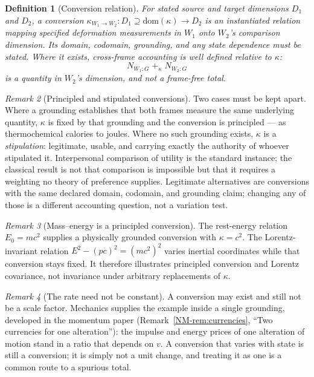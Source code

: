 \documentclass[11pt,a4paper]{article}
\newtheorem{definition}{Definition}[section]
\theoremstyle{remark}
\newtheorem{remark}[definition]{Remark}
\begin{document}
\begin{definition}[Conversion relation]\label{def:conversion}
For stated source and target dimensions $D_1$ and $D_2$, a conversion
$\kappa_{W_1\to W_2}:D_1\supseteq\mathrm{dom}(\kappa)\to D_2$ is an instantiated relation mapping
specified deformation measurements in $W_1$ onto $W_2$'s comparison dimension. Its domain, codomain,
grounding, and any state dependence must be stated. Where it exists, cross-frame accounting is well
defined \emph{relative to $\kappa$}:
\[
N_{W_1:G}\;+_{\kappa}\;N_{W_2:G}
\]
is a quantity in $W_2$'s dimension, and not a frame-free total.
\end{definition}

\begin{remark}[Principled and stipulated conversions]\label{rem:kappa-kinds}
Two cases must be kept apart. Where a grounding establishes that both frames measure the same underlying quantity, $\kappa$ is fixed by that grounding and the conversion is principled --- as thermochemical calories to joules. Where no such grounding exists, $\kappa$ is a \emph{stipulation}: legitimate, usable, and carrying exactly the authority of whoever stipulated it. Interpersonal comparison of utility is the standard instance; the classical result is not that comparison is impossible but that it requires a weighting no theory of preference supplies. Legitimate alternatives are conversions with the same declared domain, codomain, and grounding claim; changing any of those is a different accounting question, not a variation test.
\end{remark}

\begin{remark}[Mass--energy is a principled conversion]\label{rem:emc2}
The rest-energy relation $E_0=mc^2$ supplies a physically grounded
conversion with $\kappa=c^2$. The Lorentz-invariant relation
$E^2-(pc)^2=(mc^2)^2$ varies inertial coordinates while that conversion
stays fixed. It therefore illustrates principled conversion and Lorentz
covariance, not invariance under arbitrary replacements of $\kappa$.
\end{remark}

\begin{remark}[The rate need not be constant]\label{rem:nonconstant-kappa}
A conversion may exist and still not be a scale factor. Mechanics supplies the example inside a single grounding, developed in the momentum paper (Remark~\ref{NM-rem:currencies}, ``Two currencies for one alteration''): the impulse and energy prices of one alteration of motion stand in a ratio that depends on $v$. A conversion that varies with state is still a conversion; it is simply not a unit change, and treating it as one is a common route to a spurious total.
\end{remark}
\end{document}
